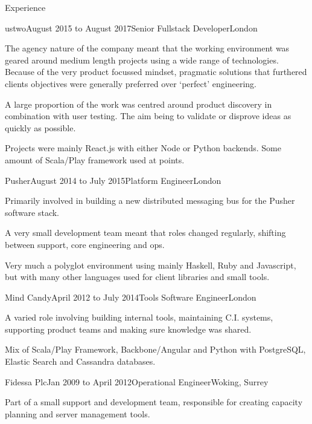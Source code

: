 \documentclass{resume} %
\begin{document}
\begin{rSection}{Experience}

  \begin{rExperience}{ustwo}{August 2015 to August 2017}{Senior Fullstack Developer}{London}
  \item The agency nature of the company meant that the working environment was geared around medium length projects using a wide range of technologies. Because of the very product focussed mindset, pragmatic solutions that furthered clients objectives were generally preferred over `perfect' engineering.
  \item A large proportion of the work was centred around product discovery in combination with user testing. The aim being to validate or disprove ideas as quickly as possible.
  \item Projects were mainly React.js with either Node or Python backends. Some amount of Scala/Play framework used at points.
  \end{rExperience}


  \begin{rExperience}{Pusher}{August 2014 to July 2015}{Platform Engineer}{London}
  \item Primarily involved in building a new distributed messaging bus for the Pusher software stack.
  \item A very small development team meant that roles changed regularly, shifting between support, core engineering and ops.
  \item Very much a polyglot environment using mainly Haskell, Ruby and Javascript, but with many other languages used for client libraries and small tools.
  \end{rExperience}


  \begin{rExperience}{Mind Candy}{April 2012 to July 2014}{Tools Software Engineer}{London}
  \item A varied role involving building internal tools, maintaining C.I. systems, supporting product teams and making sure knowledge was shared.
  \item Mix of Scala/Play Framework, Backbone/Angular and Python with PostgreSQL, Elastic Search and Cassandra databases.
  \end{rExperience}


  \begin{rExperience}{Fidessa Plc}{Jan 2009 to April 2012}{Operational Engineer}{Woking, Surrey}
  \item Part of a small support and development team, responsible for creating capacity planning and server management tools.
  \end{rExperience}

\end{rSection}
\end{document}
